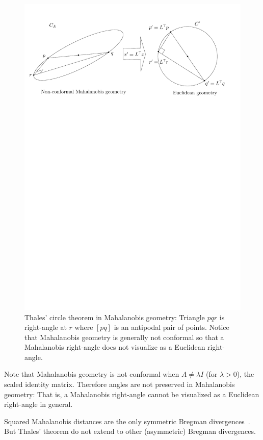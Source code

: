 \documentclass{article}
\begin{document}
\begin{figure}%
\centering
\includegraphics[width=0.7\columnwidth]{Fig-ThalesMahalanobisTheorem.pdf}%
\caption{Thales' circle theorem in Mahalanobis geometry: Triangle $pqr$ is right-angle at $r$ where $[pq]$ is an antipodal pair of points.
Notice that Mahalanobis geometry is generally not conformal so that a Mahalanobis right-angle does not visualize as a Euclidean right-angle.}%
\label{fig:mahthales}%
\end{figure}


Note that Mahalanobis geometry is not conformal when $A\not =\lambda I$ (for $\lambda>0$), the scaled identity matrix.
Therefore angles are not preserved in Mahalanobis geometry: 
That is, a Mahalanobis right-angle cannot be visualized as a Euclidean right-angle in general.


Squared Mahalanobis distances are the only symmetric Bregman divergences~\cite{BVD-2010}.
But Thales' theorem do not extend to other (asymmetric) Bregman divergences.







\end{document}
